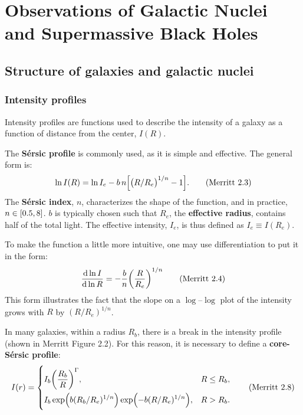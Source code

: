 \documentclass[degn-notes.tex]{subfiles}
\begin{document}
\setcounter{chapter}{1}

\chapter{Observations of Galactic Nuclei and Supermassive Black Holes}

\section{Structure of galaxies and galactic nuclei}

\subsection{Intensity profiles}

Intensity profiles are functions used to describe the intensity of a galaxy as a function of distance from the center, $I(R)$.

The \textbf{S{\'e}rsic profile} is commonly used, as it is simple and effective. The general form is:
%
\begin{displaymath}
  \ln I(R) = \ln I_e - b \, n \qty[ \qty(R/R_e)^{1/n} - 1 ].
%
  \tag{Merritt 2.3}
  \label{merritt:2.3}
\end{displaymath}
%
The \textbf{S{\'e}rsic index}, $n$, characterizes the shape of the function, and in practice, $n \in \intcc{0.5, 8}$. $b$ is typically chosen such that $R_e$, the \textbf{effective radius}, contains half of the total light. The effective intensity, $I_e$, is thus defined as $I_e \equiv I(R_e)$.

To make the function a little more intuitive, one may use differentiation to put it in the form:
%
\begin{displaymath}
  \dv{\ln I}{\ln R} = -\frac{b}{n} \qty( \frac{R}{R_e} )^{1/n}
%
  \tag{Merritt 2.4}
  \label{merritt:2.4}
\end{displaymath}
%
This form illustrates the fact that the slope on a $\log$--$\log$ plot of the intensity grows with $R$ by $(R/R_e)^{1/n}$.

In many galaxies, within a radius $R_b$, there is a break in the intensity profile (shown in Merritt Figure 2.2). For this reason, it is necessary to define a \textbf{core-S{\'e}rsic profile}:
%
\begin{displaymath}
  I(r) =
  \begin{dcases}
    I_b \qty( \frac{R_b}{R} )^\Gamma,
    & R \leq R_b,
    \\
    I_b \exp(b(R_b/R_e)^{1/n}) \exp(-b(R/R_e)^{1/n}),
    & R > R_b.
  \end{dcases}
%
  \tag{Merritt 2.8}
  \label{merritt:2.8}
\end{displaymath}
\end{document}
